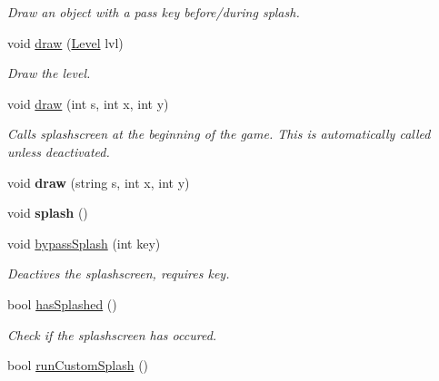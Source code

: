 \begin{DoxyCompactItemize}
\begin{DoxyCompactList}\small\item\em Draw an object with a pass key before/during splash. \end{DoxyCompactList}\item 
void \hyperlink{classEngine_a9435c9399f0d3952032c106e7ee8f6e9}{draw} (\hyperlink{classLevel}{Level} lvl)\hypertarget{classEngine_a9435c9399f0d3952032c106e7ee8f6e9}{}\label{classEngine_a9435c9399f0d3952032c106e7ee8f6e9}

\begin{DoxyCompactList}\small\item\em Draw the level. \end{DoxyCompactList}\item 
void \hyperlink{classEngine_a4eb9f3f3e8207ef4b0dfcc0d1889d176}{draw} (int s, int x, int y)\hypertarget{classEngine_a4eb9f3f3e8207ef4b0dfcc0d1889d176}{}\label{classEngine_a4eb9f3f3e8207ef4b0dfcc0d1889d176}

\begin{DoxyCompactList}\small\item\em Calls splashscreen at the beginning of the game. This is automatically called unless deactivated. \end{DoxyCompactList}\item 
void {\bfseries draw} (string s, int x, int y)\hypertarget{classEngine_ab84c2e814c44d511e12891c60ae66e96}{}\label{classEngine_ab84c2e814c44d511e12891c60ae66e96}

\item 
void {\bfseries splash} ()\hypertarget{classEngine_adb6f1426c5c57f9d60be1e10d8eb2506}{}\label{classEngine_adb6f1426c5c57f9d60be1e10d8eb2506}

\item 
void \hyperlink{classEngine_a3b9cf8a050f43e4e185748f7b2a3ded8}{bypass\+Splash} (int key)\hypertarget{classEngine_a3b9cf8a050f43e4e185748f7b2a3ded8}{}\label{classEngine_a3b9cf8a050f43e4e185748f7b2a3ded8}

\begin{DoxyCompactList}\small\item\em Deactives the splashscreen, requires key. \end{DoxyCompactList}\item 
bool \hyperlink{classEngine_aabab82c2ba4dca772a28dbbd4fe08cb4}{has\+Splashed} ()\hypertarget{classEngine_aabab82c2ba4dca772a28dbbd4fe08cb4}{}\label{classEngine_aabab82c2ba4dca772a28dbbd4fe08cb4}

\begin{DoxyCompactList}\small\item\em Check if the splashscreen has occured. \end{DoxyCompactList}\item 
bool \hyperlink{classEngine_a5c87c90c9dd6b3fd652e24af0c7e935d}{run\+Custom\+Splash} ()\hypertarget{classEngine_a5c87c90c9dd6b3fd652e24af0c7e935d}{}\label{classEngine_a5c87c90c9dd6b3fd652e24af0c7e935d}


\end{DoxyCompactItemize}
